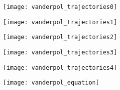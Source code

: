 \documentclass[11pt]{article}
\begin{document}
\begin{figure}[H]
\centering
\texttt{[image: vanderpol\_trajectories0]}
\end{figure}
\begin{figure}[H]
\centering
\texttt{[image: vanderpol\_trajectories1]}
\end{figure}
\begin{figure}[H]
\centering
\texttt{[image: vanderpol\_trajectories2]}
\end{figure}
\begin{figure}[H]
\centering
\texttt{[image: vanderpol\_trajectories3]}
\end{figure}
\begin{figure}[H]
\centering
\texttt{[image: vanderpol\_trajectories4]}
\end{figure}
\begin{figure}[H]
\centering
\texttt{[image: vanderpol\_equation]}
\end{figure}
 
 
\end{document}
